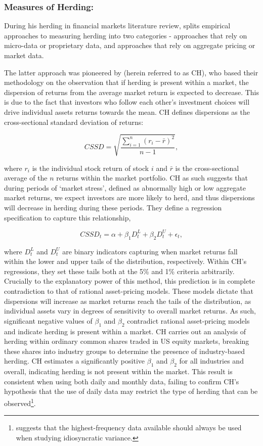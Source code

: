\documentclass[12pt]{article}
\numberwithin{table}{section}   %
\begin{document}
\subsubsection*{Measures of Herding:} 

During his herding in financial markets literature review, \citet{spyrou} splits empirical approaches to measuring herding into two categories - approaches that rely on micro-data or proprietary data, and approaches that rely on aggregate pricing or market data.

The latter approach was pioneered by \citet{ch} (herein referred to as CH), who based their methodology on the observation that if herding is present within a market, the dispersion of returns from the average market return is expected to decrease. This is due to the fact that investors who follow each other’s investment choices will drive individual assets returns towards the mean. CH defines dispersions as the cross-sectional standard deviation of returns:

$$
CSSD=\sqrt{\frac{\sum^n_{i=1}{(r_i-\bar{r})^2}}{n-1}},
$$

where $r_i$ is the individual stock return of stock $i$ and $\bar{r}$ is the cross-sectional average of the $n$ returns within the market portfolio. CH as such suggests that during periods of ‘market stress’, defined as abnormally high or low aggregate market returns, we expect investors are more likely to herd, and thus dispersions will decrease in herding during these periods. They define a regression specification to capture this relationship, 

$$
CSSD_t=\alpha+\beta_1D^L_t+\beta_2D^U_t+\epsilon_t,
$$

where $D^L_t$ and $D^U_t$ are binary indicators capturing when market returns fall within the lower and upper tails of the distribution, respectively. Within CH’s regressions, they set these tails both at the 5\% and 1\% criteria arbitrarily. Crucially to the explanatory power of this method, this prediction is in complete contradiction to that of rational asset-pricing models. These models dictate that dispersions will increase as market returns reach the tails of the distribution, as individual assets vary in degrees of sensitivity to overall market returns. As such, significant negative values of $\beta_1$ and $\beta_2$ contradict rational asset-pricing models and indicate herding is present within a market. CH carries out an analysis of herding within ordinary common shares traded in US equity markets, breaking these shares into industry groups to determine the presence of industry-based herding. CH estimates a significantly positive $\beta_1$ and $\beta_2$ for all industries and overall, indicating herding is not present within the market. This result is consistent when using both daily and monthly data, failing to confirm CH’s hypothesis that the use of daily data may restrict the type of herding that can be observed\footnote{\citet{richards} suggests that the highest-frequency data available should always be used when studying idiosyncratic variance.}.
\end{document}
